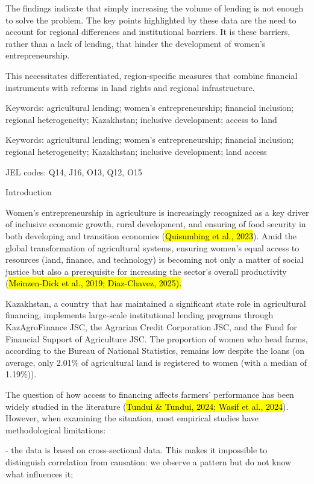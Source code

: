 The findings indicate that simply increasing the volume of lending is
not enough to solve the problem. The key points highlighted by these
data are the need to account for regional differences and institutional
barriers. It is these barriers, rather than a lack of lending, that
hinder the development of women's entrepreneurship.

This necessitates differentiated, region-specific measures that combine
financial instruments with reforms in land rights and regional
infrastructure.

Keywords: agricultural lending; women's entrepreneurship; financial
inclusion; regional heterogeneity; Kazakhstan; inclusive development;
access to land

Keywords: agricultural lending; women's entrepreneurship; financial
inclusion; regional heterogeneity; Kazakhstan; inclusive development;
land access

JEL codes: Q14, J16, O13, Q12, O15

Introduction

Women's entrepreneurship in agriculture is increasingly recognized as a
key driver of inclusive economic growth, rural development, and ensuring
of food security in both developing and transition economies
(\hl{Quisumbing et al., 2023}). Amid the global transformation of
agricultural systems, ensuring women's equal access to resources (land,
finance, and technology) is becoming not only a matter of social justice
but also a prerequisite for increasing the sector's overall productivity
(\hl{Meinzen-Dick et al., 2019; Diaz-Chavez, 2025).}

Kazakhstan, a country that has maintained a significant state role in
agricultural financing, implements large-scale institutional lending
programs through KazAgroFinance JSC, the Agrarian Credit Corporation
JSC, and the Fund for Financial Support of Agriculture JSC. The
proportion of women who head farms, according to the Bureau of National
Statistics, remains low despite the loans (on average, only 2.01\% of
agricultural land is registered to women (with a median of 1.19\%)).

The question of how access to financing affects farmers' performance has
been widely studied in the literature (\hl{Tundui \& Tundui, 2024; Wasif
et al., 2024}). However, when examining the situation, most empirical
studies have methodological limitations:

- the data is based on cross-sectional data. This makes it impossible to
distinguish correlation from causation: we observe a pattern but do not
know what influences it;

